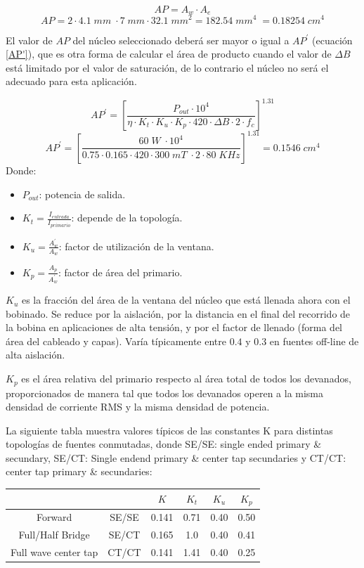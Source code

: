 \documentclass[11pt, a4paper]{article}
\begin{document}
\begin{equation}
AP = A_w \cdot A_e
\label{AP}
\end{equation}
\[ AP = 2\cdot 4.1 \; mm \; \cdot 7 \; mm \cdot 32.1 \; mm^2 = 182.54 \; mm^4 \; = 0.18254 \; cm^4 \]

El valor de $AP$ del núcleo seleccionado deberá ser mayor o igual a $AP^{'}$ (ecuación \ref{AP'}), que es otra forma de calcular el área de producto cuando el valor de $\Delta B$ está limitado por el valor de saturación, de lo contrario el núcleo no será el adecuado para esta aplicación.

\begin{equation}
AP^{'} = [\frac{P_{out} \cdot 10^4}{\eta \cdot K_t \cdot K_u \cdot K_p \cdot 420 \cdot \Delta B \cdot 2 \cdot f_c}]^{1.31}
\end{equation}
\[ AP^{'} = [\frac{60 \; W \; \cdot 10^4}{0.75 \cdot 0.165 \cdot 420 \cdot 300 \; mT \; \cdot 2 \cdot 80 \; KHz}]^{1.31} = 0.1546 \; cm^4 \]
Donde:
\begin{itemize}
	\item $P_{out}$: potencia de salida.
	\item $K_t = \frac{I_{entrada}}{I_{primario}}$: depende de la topología.
	\item $K_u = \frac{A^{'}_w}{A_w}$: factor de utilización de la ventana.
	\item $K_p = \frac{A_p}{A^{'}_w}$: factor de área del primario. 
\end{itemize}

$K_u$ es la fracción del área de la ventana del núcleo que está llenada ahora con el bobinado. Se reduce por la aislación, por la distancia en el final del recorrido de la bobina en aplicaciones de alta tensión, y por el factor de llenado (forma del área del cableado y capas). Varía típicamente entre $0.4$ y $0.3$ en fuentes off-line de alta aislación.

$K_p$ es el área relativa del primario respecto al área total de todos los devanados, proporcionados de manera tal que todos los devanados operen a la misma densidad de corriente RMS y la misma densidad de potencia.

La siguiente tabla muestra valores típicos de las constantes K para distintas topologías de fuentes conmutadas, donde SE/SE: single ended primary \& secundary, SE/CT: Single endend primary \& center tap secundaries y CT/CT: center tap primary \& secundaries:
\begin{center}
	\begin{tabular}[h]{|c|c|c|c|c|c|}
		\hline
		 & & $K$ & $K_t$ & $K_u$ & $K_p$ \\
		 \hline
		 Forward & SE/SE & 0.141 & 0.71 & 0.40 & 0.50 \\
		 Full/Half Bridge & SE/CT & 0.165 & 1.0 & 0.40 & 0.41 \\ 
		 Full wave center tap & CT/CT & 0.141 & 1.41 & 0.40 & 0.25\\
		 \hline
	\end{tabular}
\end{center}
\end{document}
